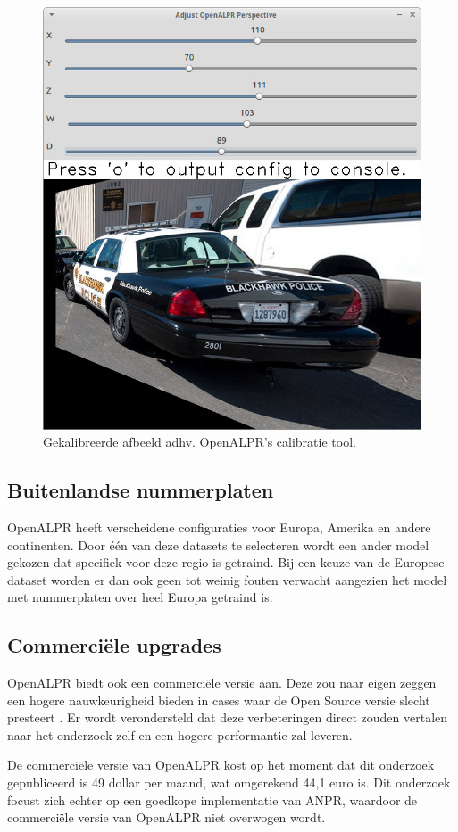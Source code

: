 \begin{figure}[h!]
	\centering
	\includegraphics[width=0.7\linewidth]{img/calibration/configuration_calibration_tool.jpg}
	\caption{Gekalibreerde afbeeld adhv. OpenALPR's calibratie tool. \autocite{openalpr2015pattern}}
	\label{calibration-openalpr-after}
\end{figure}

\subsection{Buitenlandse nummerplaten}
OpenALPR heeft verscheidene configuraties voor Europa, Amerika en andere continenten. Door één van deze datasets te selecteren wordt een ander model gekozen dat specifiek voor deze regio is getraind. Bij een keuze van de Europese dataset worden er dan ook geen tot weinig fouten verwacht aangezien het model met nummerplaten over heel Europa getraind is.

\subsection{Commerciële upgrades}
OpenALPR biedt ook een commerciële versie aan. Deze zou naar eigen zeggen een hogere nauwkeurigheid bieden in cases waar de Open Source versie slecht presteert \autocite{openalpr2019benchmark}. Er wordt verondersteld dat deze verbeteringen direct zouden vertalen naar het onderzoek zelf en een hogere performantie zal leveren.

De commerciële versie van OpenALPR kost op het moment dat dit onderzoek gepubliceerd is 49 dollar per maand, wat omgerekend 44,1 euro is. Dit onderzoek focust zich echter op een goedkope implementatie van ANPR, waardoor de commerciële versie van OpenALPR niet overwogen wordt.
